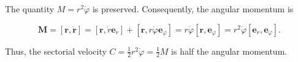 The quantity $M = r^2 \dot{\varphi}$ is preserved. Consequently, the angular momentum is

$$\mathbf{M} = [\mathbf{r}, \dot{\mathbf{r}}] = [\mathbf{r}, \dot{r} \mathbf{e}_r] + [\mathbf{r}, r \dot{\varphi} \mathbf{e}_\varphi] = r \dot{\varphi}[\mathbf{r}, \mathbf{e}_\varphi] = r^2 \dot{\varphi}[\mathbf{e}_r, \mathbf{e}_\varphi].$$

Thus, the sectorial velocity $C = \frac{1}{2} r^2 \dot{\varphi} = \frac{1}{2} M$ is half the angular momentum.
